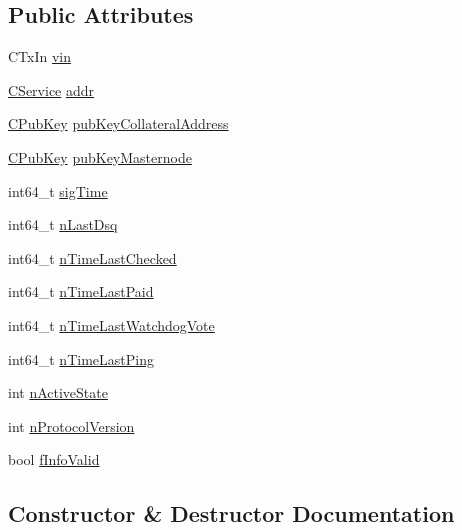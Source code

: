 \subsection*{Public Attributes}
\begin{DoxyCompactItemize}
\item 
C\+Tx\+In \mbox{\hyperlink{structmasternode__info__t_a55ac644d701067dfa6123ae19e0301c8}{vin}}
\item 
\mbox{\hyperlink{class_c_service}{C\+Service}} \mbox{\hyperlink{structmasternode__info__t_a94318eaf9a7d26dc7295b2966b1623de}{addr}}
\item 
\mbox{\hyperlink{class_c_pub_key}{C\+Pub\+Key}} \mbox{\hyperlink{structmasternode__info__t_a801b60c54850f0484a2deeb159dd0f2e}{pub\+Key\+Collateral\+Address}}
\item 
\mbox{\hyperlink{class_c_pub_key}{C\+Pub\+Key}} \mbox{\hyperlink{structmasternode__info__t_a6beb4f11f53a2867c8cb5cdf6d37db14}{pub\+Key\+Masternode}}
\item 
int64\+\_\+t \mbox{\hyperlink{structmasternode__info__t_a6cb66488a4dbecd5630dad10d3a4375e}{sig\+Time}}
\item 
int64\+\_\+t \mbox{\hyperlink{structmasternode__info__t_a261f8970f5ab931b00a6d950bfe56885}{n\+Last\+Dsq}}
\item 
int64\+\_\+t \mbox{\hyperlink{structmasternode__info__t_a1303e093d35a2069a69177b9f640d74f}{n\+Time\+Last\+Checked}}
\item 
int64\+\_\+t \mbox{\hyperlink{structmasternode__info__t_a9e62a8ee9a8d74a29d1e3565cf321955}{n\+Time\+Last\+Paid}}
\item 
int64\+\_\+t \mbox{\hyperlink{structmasternode__info__t_a17e8202a1bb1b432a4d514893928c1c5}{n\+Time\+Last\+Watchdog\+Vote}}
\item 
int64\+\_\+t \mbox{\hyperlink{structmasternode__info__t_aa501257d941851a2e4a172f8f07ab85f}{n\+Time\+Last\+Ping}}
\item 
int \mbox{\hyperlink{structmasternode__info__t_ad74c5f98ced430dc03ec8cf37c5ac5e9}{n\+Active\+State}}
\item 
int \mbox{\hyperlink{structmasternode__info__t_a725fe665dff2e2a9b184ce5c81190544}{n\+Protocol\+Version}}
\item 
bool \mbox{\hyperlink{structmasternode__info__t_aac9e2929d80d683b015f83e36bc46e31}{f\+Info\+Valid}}
\end{DoxyCompactItemize}


\subsection{Constructor \& Destructor Documentation}
\mbox{\label{structmasternode__info__t_aae48a182910df4ceb63ec573c031d48b}} 
